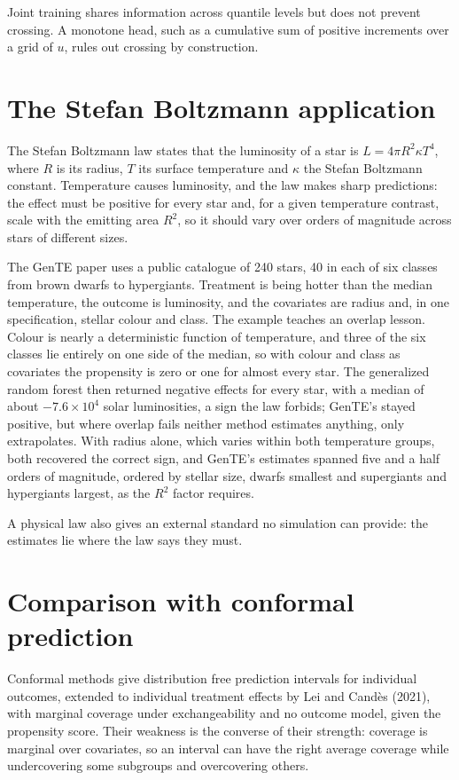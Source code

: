 Joint training shares information across quantile levels but does not prevent crossing. A monotone head, such as a cumulative sum of positive increments over a grid of $u$, rules out crossing by construction.

\section{The Stefan Boltzmann application}

The Stefan Boltzmann law states that the luminosity of a star is $L = 4\pi R^2\kappa T^4$, where $R$ is its radius, $T$ its surface temperature and $\kappa$ the Stefan Boltzmann constant. Temperature causes luminosity, and the law makes sharp predictions: the effect must be positive for every star and, for a given temperature contrast, scale with the emitting area $R^2$, so it should vary over orders of magnitude across stars of different sizes.

The GenTE paper uses a public catalogue of 240 stars, 40 in each of six classes from brown dwarfs to hypergiants. Treatment is being hotter than the median temperature, the outcome is luminosity, and the covariates are radius and, in one specification, stellar colour and class. The example teaches an overlap lesson. Colour is nearly a deterministic function of temperature, and three of the six classes lie entirely on one side of the median, so with colour and class as covariates the propensity is zero or one for almost every star. The generalized random forest then returned negative effects for every star, with a median of about $-7.6 \times 10^4$ solar luminosities, a sign the law forbids; GenTE's stayed positive, but where overlap fails neither method estimates anything, only extrapolates. With radius alone, which varies within both temperature groups, both recovered the correct sign, and GenTE's estimates spanned five and a half orders of magnitude, ordered by stellar size, dwarfs smallest and supergiants and hypergiants largest, as the $R^2$ factor requires.

 A physical law also gives an external standard no simulation can provide: the estimates lie where the law says they must.

\section{Comparison with conformal prediction}

Conformal methods give distribution free prediction intervals for individual outcomes, extended to individual treatment effects by Lei and Cand\`es (2021), with marginal coverage under exchangeability and no outcome model, given the propensity score. Their weakness is the converse of their strength: coverage is marginal over covariates, so an interval can have the right average coverage while undercovering some subgroups and overcovering others.


